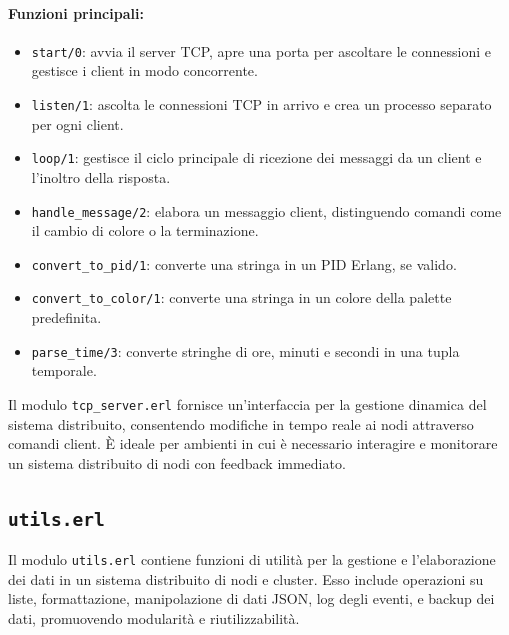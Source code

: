 \documentclass[12pt, a4paper]{report}
\begin{document}
\paragraph{Funzioni principali:}
\begin{itemize}
    \item \texttt{start/0}: avvia il server TCP, apre una porta per ascoltare le connessioni e gestisce i client in modo concorrente.
    \item \texttt{listen/1}: ascolta le connessioni TCP in arrivo e crea un processo separato per ogni client.
    \item \texttt{loop/1}: gestisce il ciclo principale di ricezione dei messaggi da un client e l'inoltro della risposta.
    \item \texttt{handle\_message/2}: elabora un messaggio client, distinguendo comandi come il cambio di colore o la terminazione.
    \item \texttt{convert\_to\_pid/1}: converte una stringa in un PID Erlang, se valido.
    \item \texttt{convert\_to\_color/1}: converte una stringa in un colore della palette predefinita.
    \item \texttt{parse\_time/3}: converte stringhe di ore, minuti e secondi in una tupla temporale.
\end{itemize}

\noindent
Il modulo \texttt{tcp\_server.erl} fornisce un'interfaccia per la gestione dinamica del sistema distribuito, consentendo modifiche in tempo reale ai nodi attraverso comandi client. È ideale per ambienti in cui è necessario interagire e monitorare un sistema distribuito di nodi con feedback immediato.

\subsection{\texttt{utils.erl}}

Il modulo \texttt{utils.erl} contiene funzioni di utilità per la gestione e l'elaborazione dei dati in un sistema distribuito di nodi e cluster. Esso include operazioni su liste, formattazione, manipolazione di dati JSON, log degli eventi, e backup dei dati, promuovendo modularità e riutilizzabilità.
\end{document}
